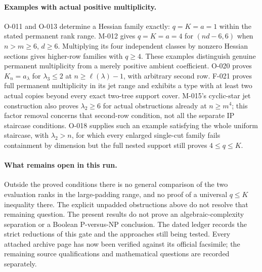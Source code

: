 \paragraph{Examples with actual positive multiplicity.}
O-011 and O-013 determine a Hessian family exactly:
\(q=K=a=1\) within the stated permanent rank range.
M-012 gives \(q=K=a=4\) for \((nd-6,6)\) when
\(n>m\geq6\), \(d\geq6\). Multiplying its four independent
classes by nonzero Hessian sections gives higher-row families
with \(q\geq4\). These examples distinguish genuine
permanent multiplicity from a merely positive ambient coefficient.
O-020 proves \(K_n=a_\lambda\) for \(\lambda_3\leq2\)
at \(n\geq\ell(\lambda)-1\), with arbitrary second row.
F-021 proves full permanent multiplicity in its jet range and
exhibits a type with at least two actual copies beyond every
exact two-tree support cover. M-015's cyclic-star jet construction
also proves \(\lambda_2\geq6\) for actual obstructions already
at \(n\geq m^4\); this factor removal concerns that second-row
condition, not all the separate IP staircase conditions.
O-018 supplies such an example satisfying the whole uniform
staircase, with \(\lambda_2>n\), for which every enlarged
single-cut family fails containment by dimension but the full
nested support still proves \(4\leq q\leq K\).

\paragraph{What remains open in this run.}
Outside the proved conditions there is no general comparison
of the two evaluation ranks in the large-padding range, and no
proof of a universal \(q\leq K\) inequality there. The explicit
unpadded obstructions above do not resolve that remaining question. The present
results do not prove an algebraic-complexity separation or a
Boolean P-versus-NP conclusion. The dated ledger records the
strict reductions of this gate and the approaches still being
tested. Every attached archive page has now been verified against
its official facsimile; the remaining source qualifications and
mathematical questions are recorded separately.
\clearpage
